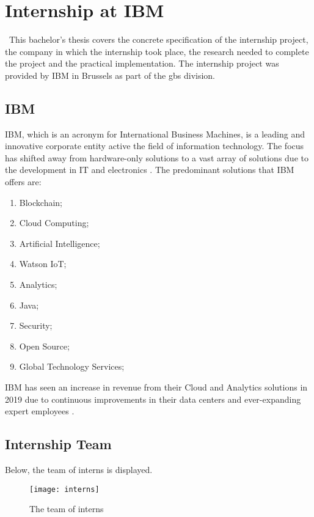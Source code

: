 \section{Internship at IBM}\
This bachelor's thesis covers the concrete specification of the internship project, the company in which the internship took place, the research needed to complete the project and the practical implementation. The internship project was provided by IBM in Brussels as part of the \acrfull{gbs} division.
\subsection{IBM}
IBM, which is an acronym for International Business Machines, is a leading and innovative corporate entity active the field of information technology. The focus has shifted away from hardware-only solutions to a vast array of solutions due to the development in IT and electronics \cite{IBMa}. The predominant solutions that IBM offers are:
\begin{enumerate}
\item Blockchain;
\item Cloud Computing;
\item Artificial Intelligence;
\item Watson IoT;
\item Analytics;
\item Java;
\item Security;
\item Open Source;
\item Global Technology Services;
\end{enumerate}
IBM has seen an increase in revenue from their Cloud and Analytics solutions in 2019 due to continuous improvements in their data centers and ever-expanding expert employees \cite{Condon2019}.
\subsection{Internship Team}
Below, the team of interns is displayed.
\begin{figure}[h!]
\centering
\texttt{[image: interns]}
\caption{The team of interns}
\label{fig:toa}
\end{figure}

